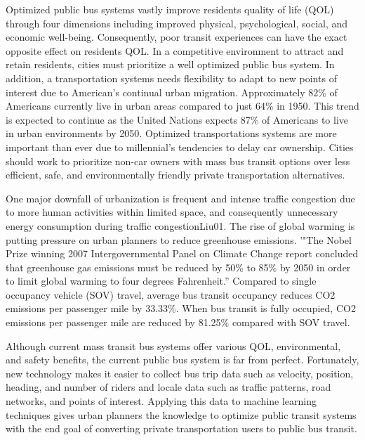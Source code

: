 \documentclass[sigconf]{acmart}
\begin{document}
Optimized public bus systems vastly improve residents quality of life (QOL) through four dimensions including improved physical, psychological, social, and economic well-being\cite{RichardJ01}. Consequently, poor transit experiences can have the exact opposite effect on residents QOL.  In a competitive environment to attract and retain residents, cities must prioritize a well optimized public bus system. In addition, a transportation systems needs flexibility to adapt to new points of interest due to American's continual urban migration. Approximately 82\% of Americans currently live in urban areas compared to just 64\% in 1950. This trend is expected to continue as the United Nations expects 87\% of Americans to live in urban environments by 2050\cite{Boyd01}. Optimized transportations systems are more important than ever due to millennial's tendencies to delay car ownership\cite{Etehad01}. Cities should work to prioritize non-car owners with mass bus transit options over less efficient, safe, and environmentally friendly private transportation alternatives.

One major downfall of urbanization is frequent and intense traffic congestion due to more human activities within limited space, and consequently unnecessary energy consumption during traffic congestion{Liu01}. The rise of global warming is putting pressure on urban planners to reduce greenhouse emissions. '"The Nobel Prize winning 2007 Intergovernmental Panel on Climate Change report concluded that greenhouse gas emissions must be reduced by 50\% to 85\% by 2050 in order to limit global warming to four degrees Fahrenheit\cite{Hodges01}.'' Compared to single occupancy vehicle (SOV) travel, average bus transit occupancy reduces CO2 emissions per passenger mile by 33.33\%. When bus transit is fully occupied, CO2 emissions per passenger mile are reduced by 81.25\% compared with SOV travel\cite{Hodges01}. 

Although current mass transit bus systems offer various QOL, environmental, and safety benefits, the current public bus system is far from perfect. Fortunately, new technology makes it easier to collect bus trip data such as velocity, position, heading, and number of riders and locale data such as traffic patterns, road networks, and points of interest. Applying this data to machine learning techniques gives urban planners the knowledge to optimize public transit systems with the end goal of converting private transportation users to public bus transit. 
\end{document}
